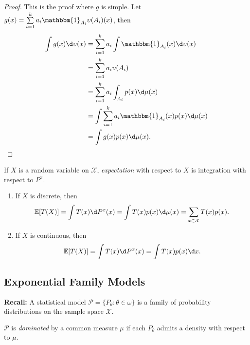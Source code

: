 \documentclass[a4paper]{article}
\begin{document}
\begin{proof}
	This is the proof where $g$ is simple. Let $g(x) = \sum\limits_{i = 1} ^k a_i \mathbbm{1}_{A_i} \upsilon (A_i) (x)$, then
	\begin{equation}
		\begin{aligned}
			\int g(x) \d \upsilon(x) &= \sum\limits_{i = 1}^k a_i \int \mathbbm{1}_{A_i} (x) \d \upsilon(x)\\
			&= \sum\limits_{i = 1}^k a_i \upsilon (A_i)\\
			&= \sum\limits_{i = 1}^k a_i \int_{A_i} p(x) \d \mu (x)\\
			& = \int \sum\limits_{i = 1}^k a_i \mathbbm{1}_{A_i} (x) p(x) \d \mu (x)\\
			& = \int g(x)p(x) \d \mu (x).
		\end{aligned}
	\end{equation}
\end{proof}

\begin{defi}[Expection]
	If $X$ is a random variable on $\mathcal{X}$, \emph{expectation} with respect to $X$ is integration with respect to $P^x$.
\end{defi}

\begin{eg}
	\quad
	\begin{enumerate}
		\item If $X$ is discrete, then
		\begin{equation}
			\mathbb{E} [T(X)] = \int T(x) \d P^x (x) = \int T(x) p(x) \d \mu (x) = \sum\limits_{x \in \mathcal{X}} T(x)p(x).
		\end{equation}
		\item If $X$ is continuous, then
		\begin{equation}
			\mathbb{E} [T(X)] = \int T(x) \d P^x (x) = \int T(x) p(x) \d x.
		\end{equation}
	\end{enumerate}
\end{eg}

\subsection{Exponential Family Models}
\textbf{Recall:} A statistical model $\mathcal{P} = \{P_\theta: \theta \in \omega\}$ is a family of probability distributions on the sample space $\mathcal{X}$.

\begin{defi}[Domination]
	$\mathcal{P}$ is \emph{dominated} by a common measure $\mu$ if each $P_{\theta}$ admits a density with respect to $\mu$.
\end{defi}
\end{document}
